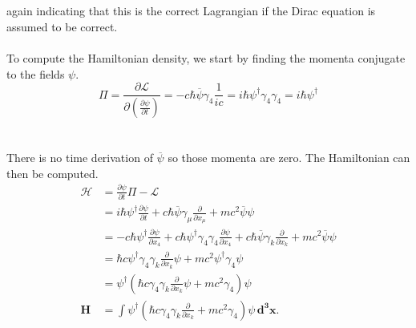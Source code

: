 \documentclass{report}
\begin{document}
\\
\\
again indicating that this is the correct Lagrangian if the Dirac equation is assumed to be correct.
\\
\\
To compute the Hamiltonian density, we start by finding the momenta conjugate to the fields $\psi$.
\begin{equation}
	\Pi = \frac{ \partial \mathcal{L} }{ \partial \left( \frac{ \partial \psi }{ \partial t }  \right)  }  = - c\hbar\overline{\psi}\gamma_4 \frac{1}{ic} = i\hbar \psi^{\dagger} \gamma_4 \gamma_4 = i\hbar \psi^{\dagger}
\end{equation}
\\
\\
There is no time derivation of $\displaystyle \overline{\psi}$ so those momenta are zero. The Hamiltonian can then be computed.
\begin{align*}
	\mathcal{H} & = \frac{ \partial \psi }{ \partial t } \Pi - \mathcal{L}                                                                                                                                                                                                \\
	            & = i \hbar \psi^{\dagger} \frac{ \partial \psi }{ \partial t }  + c \hbar \overline{\psi} \gamma_{\mu} \frac{ \partial  }{ \partial x_{\mu} } + mc^2 \overline{\psi} \psi                                                                                \\
	            & = - c \hbar \psi^{\dagger} \frac{ \partial \psi }{ \partial x_4 } + c \hbar \psi^{\dagger} \gamma_4 \gamma_4 \frac{ \partial \psi }{ \partial x_4 } + c \hbar \overline{\psi}\gamma_{k} \frac{ \partial  }{ \partial x_{k} } + mc^2\overline{\psi} \psi \\
	            & = \hbar c \psi^{\dagger} \gamma_4 \gamma_{k} \frac{ \partial  }{ \partial x_{k} } \psi + mc^2 \psi^{\dagger} \gamma_4 \psi                                                                                                                              \\
	            & = \psi^{\dagger} \left( \hbar c \gamma_4 \gamma_{k} \frac{ \partial  }{ \partial x_{k} } \psi + mc^2 \gamma_4 \right) \psi                                                                                                                              \\
	\mathbf{H}  & = \int \psi^{\dagger} \left( \hbar c \gamma_4 \gamma_{k} \frac{ \partial  }{ \partial x_{k} } + mc^2 \gamma_4 \right) \psi \, \mathbf{d^3x}
	.\end{align*}
\end{document}
